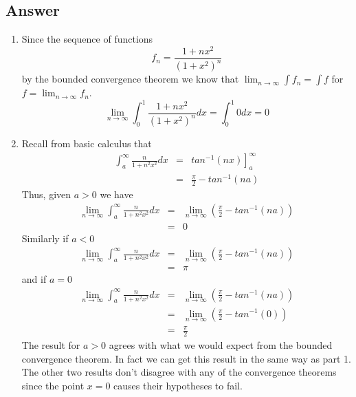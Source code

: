 \documentclass[10pt]{article}
\begin{document}
\subsection{Answer}
\begin{enumerate}
\item Since the sequence of functions
\[f_n = \frac{1+nx^2}{(1+x^2)^{n}} \]
by the bounded convergence theorem we know that $\lim_{n \to \infty} \int f_n = \int f$ for $f = \lim_{n \to \infty} f_n$.
\[\lim_{n \to \infty} \int_0^1 \frac{1+nx^2}{(1+x^2)^{n}} dx = \int_0^1 0 dx = 0 \]
\item Recall from basic calculus that
\begin{eqnarray*} \int_a^\infty \frac{n}{ 1+n^2x^2} dx &=& \left. tan^{-1}(n x) \right]_a^\infty \\ &=& \frac{\pi}{2} -  tan^{-1} (n a)\end{eqnarray*}
Thus, given $a>0$ we have 
\begin{eqnarray*} \lim_{n\to\infty} \int_a^\infty \frac{n}{ 1+n^2x^2} dx  &=& \lim_{n\to \infty} \left( \frac{\pi}{2} -  tan^{-1} (n a)\right) \\ &=& 0\end{eqnarray*}
Similarly if $a<0$
\begin{eqnarray*} \lim_{n\to\infty} \int_a^\infty \frac{n}{ 1+n^2x^2} dx  &=& \lim_{n\to \infty} \left( \frac{\pi}{2} -  tan^{-1} (n a)\right) \\ &=& \pi \end{eqnarray*}
and if $a=0$
\begin{eqnarray*} \lim_{n\to\infty} \int_a^\infty \frac{n}{ 1+n^2x^2} dx  &=& \lim_{n\to \infty} \left( \frac{\pi}{2} -  tan^{-1} (n a)\right) \\  &=& \lim_{n\to \infty} \left( \frac{\pi}{2} -  tan^{-1} (0)\right)  \\ &=& \frac{\pi}{2} \end{eqnarray*}
The result for $a>0$ agrees with what we would expect from the bounded convergence theorem. In fact we can get this result in the same way as part 1. The other two results don't disagree with any of the convergence theorems since the point $x=0$ causes their hypotheses to fail.

\end{enumerate}
\end{document}
